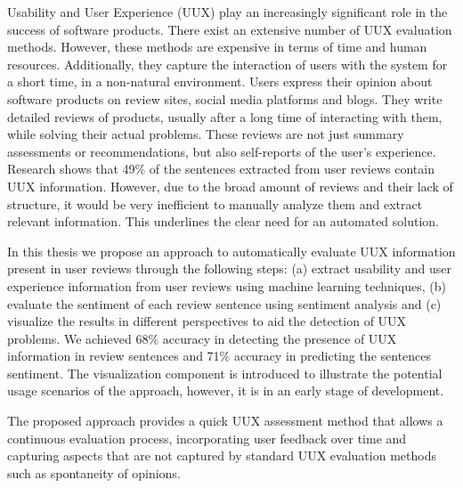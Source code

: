 \noindent
Usability and User Experience (UUX) play an increasingly significant role in the success of software products. There exist an extensive number of UUX evaluation methods. However, these methods are expensive in terms of time and human resources. Additionally, they capture the interaction of users with the system for a short time, in a non-natural environment. Users express their opinion about software products on review sites, social media platforms and blogs. They write detailed reviews of products, usually after a long time of interacting with them, while solving their actual problems. These reviews are not just summary assessments or recommendations, but also self-reports of the user's experience. Research shows that 49\% of the sentences extracted from user reviews contain UUX information.  However, due to the broad amount of reviews and their lack of  structure, it would be very inefficient to manually analyze them and extract relevant information. This underlines the clear need for an automated solution.

\noindent
In this thesis we propose an approach to automatically evaluate UUX information present in user reviews through the following steps: (a) extract usability and user experience information from user reviews using machine learning techniques, (b) evaluate the sentiment of each review sentence using sentiment analysis and (c) visualize the results in different perspectives to aid the detection of UUX problems. We achieved 68\% accuracy in detecting the presence of UUX information in review sentences and 71\% accuracy in predicting the sentences sentiment. The visualization component is introduced to illustrate the potential usage scenarios of the approach, however, it is in an early stage of development. 

\noindent
The proposed approach provides a quick UUX assessment method that allows a continuous evaluation process, incorporating user feedback over time and capturing aspects that are not captured by standard UUX evaluation methods such as spontaneity of opinions.